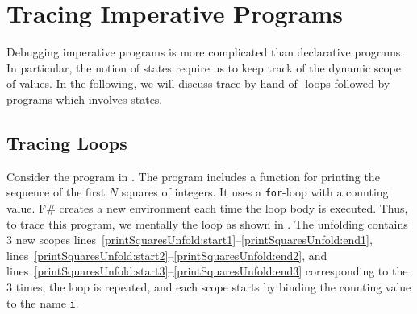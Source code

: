 \documentclass[fsharpNotes.tex]{subfiles}
\begin{document}

\section{Tracing Imperative Programs}
Debugging imperative programs is more complicated than declarative programs. In particular, the notion of states require us to keep track of the dynamic scope of values. In the following, we will discuss trace-by-hand of -loops followed by programs which involves states.

\subsection{Tracing Loops}
Consider the program in .
%
%
The program includes a function for printing the sequence of the first $N$ squares of integers. It uses a \lstinline{for}-loop with a counting value. F\# creates a new environment each time the loop body is executed. Thus, to trace this program, we mentally  the loop as shown in .
%
%
The unfolding contains 3 new scopes lines~\ref{printSquaresUnfold:start1}--\ref{printSquaresUnfold:end1}, lines~\ref{printSquaresUnfold:start2}--\ref{printSquaresUnfold:end2}, and lines~\ref{printSquaresUnfold:start3}--\ref{printSquaresUnfold:end3}  corresponding to the 3 times, the loop is repeated, and each scope starts by binding the counting value to the name \lstinline{i}.
\end{document}
